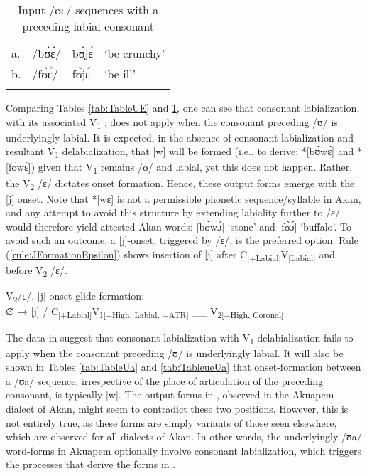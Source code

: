 \documentclass[output=paper,colorlinks,citecolor=brown]{langscibook}
\begin{document}
\begin{table}
\caption{Input /ʊɛ/ sequences with a preceding labial consonant}
\label{tab:TableUELabial}
 \begin{tabular}{llll}
  \lsptoprule
a.&	/bʊ̀ɛ́/	&bʊ̀jɛ́	&‘be crunchy’ \\
b.	& /fʊ̀ɛ́/	&fʊ̀jɛ́	&‘be ill’\\
  \lspbottomrule
 \end{tabular}
\end{table}   

Comparing Tables \ref{tab:TableUE} and \ref{tab:TableUELabial}, one can see that consonant labialization, with its associated V\textsubscript{1} , does not apply when the consonant preceding /ʊ/ is underlyingly labial. It is expected, in the absence of consonant labialization and resultant V\textsubscript{1} delabialization, that [w] will be formed (i.e., to derive: *[bʊ̀wɛ́] and *[fʊ̀wɛ́]) given that V\textsubscript{1} remains /ʊ/ and labial, yet this does not happen. Rather, the V\textsubscript{2} /ɛ/ dictates onset formation. Hence, these output forms emerge with the [j] onset. Note that *[wɛ] is not a permissible phonetic sequence/syllable in Akan, and any attempt to avoid this structure by extending labiality further to /ɛ/ would therefore yield attested Akan words: [bʊ̀wɔ́] ‘stone’ and [fʊ̀ɔ́] ‘buffalo'. To avoid such an outcome, a [j]-onset, triggered by /ɛ/, is the preferred option. Rule (\ref{rule:JFormationEpsilon}) shows insertion of [j] after C\textsubscript{[+Labial]}V\textsubscript{[Labial]} and before V\textsubscript{2} /ɛ/.

\ea \label{rule:JFormationEpsilon}
\begin{xlist}
V\textsubscript{2}/ɛ/, [j] onset-glide formation: \\
   ∅ → [j] / C\textsubscript{[+Labial]}V\textsubscript{1[+High, Labial, −ATR]} \_\_ V\textsubscript{2[−High, Coronal]}\\
\end{xlist}
\z

The data in  suggest that consonant labialization with V\textsubscript{1} delabialization fails to apply when the consonant preceding /ʊ/ is underlyingly labial. It will also be shown in Tables \ref{tab:TableUa} and \ref{tab:TableueUa} that onset-formation between a /ʊa/ sequence, irrespective of the place of articulation of the preceding consonant, is typically [w]. The output forms in , observed in the Akuapem dialect of Akan, might seem to contradict these two positions. However, this is not entirely true, as these forms are simply  variants of those seen elsewhere, which are observed for all dialects of Akan. In other words, the underlyingly /ʊa/ word-forms in Akuapem  optionally involve consonant labialization, which triggers the processes that derive the forms in .
\end{document}
